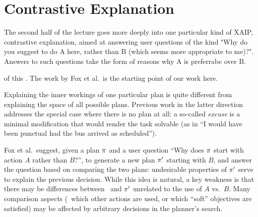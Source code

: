 \section{Contrastive Explanation}
\label{contrastive}


The second half of the lecture goes more deeply into one particular
kind of XAIP, contrastive explanation, aimed at answering user
questions of the kind "Why do you suggest to do A here, rather than B
(which seems more appropriate to me)?". Answers to such questions take
the form of reasons why A is preferrabe over B.



of this  \cite{fox:etal:ijcai-ws-17,miller:corr-18}. The work by Fox et
al.\ is the starting point of our work here.

Explaining the inner workings of one particular plan is quite
different from explaining the space of all possible plans. Previous
work in the latter direction \cite{goebelbecker:etal:icaps-10}
addresses the special case where there is no plan at all: a so-called
\emph{excuse} is a minimal modification that would render the task
solvable (as in ``I would have been punctual had the bus arrived as
scheduled''). 



Fox et al.\ suggest, given a plan $\pi$ and a user question ``Why
does $\pi$ start with action $A$ rather than $B$?'', to generate a
new plan $\pi'$ starting with $B$, and answer the question based on
comparing the two plans: undesirable properties of $\pi'$ serve to
explain the previous decision. While this idea is natural, a key
weakness is
%
%
%
that there may be differences between \plan\ and $\pi'$ unrelated to
the use of $A$ vs.\ $B$. Many comparison aspects (\eg\ which other
actions are used, or which ``soft'' objectives are satisfied) may be
affected by arbitrary decisions in the planner's search.



